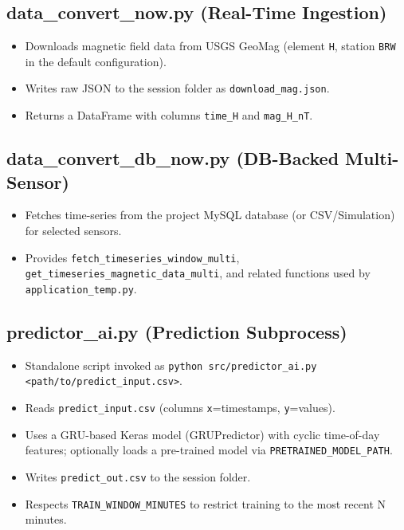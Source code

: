 \subsection{data\_convert\_now.py (Real-Time Ingestion)}
\begin{itemize}
    \item Downloads magnetic field data from USGS GeoMag (element \texttt{H}, station \texttt{BRW} in the default configuration).
    \item Writes raw JSON to the session folder as \texttt{download\_mag.json}.
    \item Returns a DataFrame with columns \texttt{time\_H} and \texttt{mag\_H\_nT}.
\end{itemize}

\subsection{data\_convert\_db\_now.py (DB-Backed Multi-Sensor)}
\begin{itemize}
    \item Fetches time-series from the project MySQL database (or CSV/Simulation) for selected sensors.
    \item Provides \texttt{fetch\_timeseries\_window\_multi}, \texttt{get\_timeseries\_magnetic\_data\_multi}, and related functions used by \texttt{application\_temp.py}.
\end{itemize}

\subsection{predictor\_ai.py (Prediction Subprocess)}
\begin{itemize}
    \item Standalone script invoked as \texttt{python src/predictor\_ai.py <path/to/predict\_input.csv>}.
    \item Reads \texttt{predict\_input.csv} (columns \texttt{x}=timestamps, \texttt{y}=values).
    \item Uses a GRU-based Keras model (GRUPredictor) with cyclic time-of-day features; optionally loads a pre-trained model via \texttt{PRETRAINED\_MODEL\_PATH}.
    \item Writes \texttt{predict\_out.csv} to the session folder.
    \item Respects \texttt{TRAIN\_WINDOW\_MINUTES} to restrict training to the most recent N minutes.
\end{itemize}


